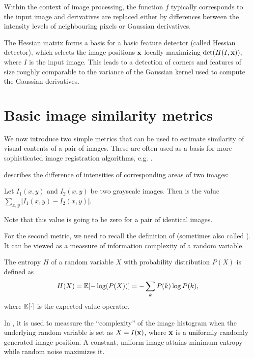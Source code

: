 Within the context of image processing, the function $f$ typically corresponds to the input image and derivatives are replaced either by differences between the intensity levels of neighbouring pixels or Gaussian derivatives. 

The Hessian matrix forms a basis for a basic feature detector (called Hessian detector), which selects the image positions $\mathbf{x}$ locally maximizing $\det(H(I, \mathbf{x})),$ where $I$ is the input image.
This leads to a detection of corners and features of size roughly comparable to the variance of the Gaussian kernel used to compute the Gaussian derivatives. %

\section{Basic image similarity metrics} %

We now introduce two simple metrics that can be used to estimate similarity of visual contents of a pair of images. 
These are often used as a basis for more sophisticated image registration algorithms, e.g. \cite{hirschmuller2008}.

 describes the difference of intensities of corresponding areas of two images: 
\begin{definition} 
Let $I_1(x, y)$ and $I_2(x, y)$ be two grayscale images. 
Then  is the value $\sum_{x, y} |I_1(x, y) - I_2(x, y)|$. 
\end{definition} 
Note that this value is going to be zero for a pair of identical images.

For the second metric, %
we need to recall the definition of  (sometimes also called ). 
It can be viewed as a meassure of information complexity of a random variable. 
\begin{definition} 
The entropy $H$ of a random variable $X$ with probability distribution $P(X)$ is defined as %
\begin{align*}
  H(X) = \mathbb{E}[-\log(P(X))] = -\sum_k{P(k)\log P(k)},
\end{align*}
where $\mathbb{E}[\cdot]$ is the expected value operator.
\end{definition}
In \cv, it is used to meassure the ``complexity'' of the image histogram when the underlying random variable is set as $X = I(\mathbf{x})$, where $\mathbf{x}$ is a uniformly randomly generated image position. 
A constant, uniform image attains minimum entropy while random noise maximizes it. 

